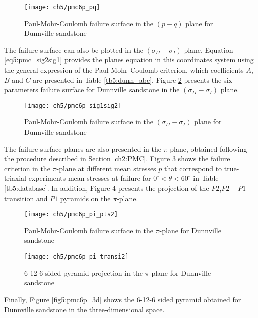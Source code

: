 \begin{figure} [p]
    \centering
    \texttt{[image: ch5/pmc6p\_pq]}
    \caption{Paul-Mohr-Coulomb failure surface in the $(p-q)$ plane for Dunnville sandstone}
    \label{fig5:pmc6p_pq}
\end{figure}

The failure surface can also be plotted in the $(\sigma_{II}-\sigma_{I})$ plane. Equation \ref{eq5:pmc_sig2sig1} provides the planes equation in this coordinates system using the general expression of the Paul-Mohr-Coulomb criterion, which coefficients $A$, $B$ and $C$ are presented in Table \ref{tb5:dunn_abc}. Figure \ref{fig5:pmc6p_sig1sig2} presents the six parameters failure surface for Dunnville sandstone in the  $(\sigma_{II}-\sigma_{I})$ plane.

\begin{figure} [p]
    \centering
    \texttt{[image: ch5/pmc6p\_sig1sig2]}
    \caption{Paul-Mohr-Coulomb failure surface in the $(\sigma_{II}-\sigma_{I})$ plane for Dunnville sandstone}
    \label{fig5:pmc6p_sig1sig2}
\end{figure}

The failure surface planes are also presented in the $\pi$-plane, obtained following the procedure described in Section \ref{ch2:PMC}. Figure \ref{fig5:pmc6p_pi_plane} shows the failure criterion in the $\pi$-plane at different mean stresses $p$ that correspond to true-triaxial experiments mean stresses at failure for $0^\circ < \theta < 60^\circ$ in Table \ref{tb5:database}. In addition, Figure \ref{fig5:pmc6p_pi_transi} presents the projection of the $P2$,$P2-P1$ transition and $P1$ pyramids on the $\pi$-plane. 

\begin{figure} [p]
    \centering
    \texttt{[image: ch5/pmc6p\_pi\_pts2]}
    \caption{Paul-Mohr-Coulomb failure surface in the $\pi$-plane for Dunnville sandstone}
    \label{fig5:pmc6p_pi_plane}
\end{figure}
\begin{figure} [p]
    \centering
    \texttt{[image: ch5/pmc6p\_pi\_transi2]}
    \caption{6-12-6 sided pyramid projection in the $\pi$-plane for Dunnville sandstone}
    \label{fig5:pmc6p_pi_transi}
\end{figure}

Finally, Figure \ref{fig5:pmc6p_3d} shows the 6-12-6 sided pyramid obtained for Dunnville sandstone in the three-dimensional space. 

